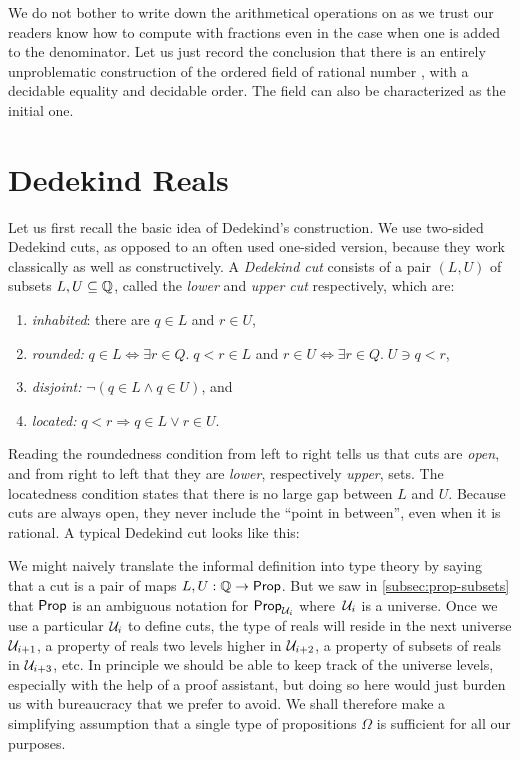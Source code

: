 We do not bother to write down the arithmetical operations on \Q as we trust our readers
know how to compute with fractions even in the case when one is added to the denominator.
Let us just record the conclusion that there is an entirely unproblematic construction of
the ordered field of rational number \Q, with a decidable equality and decidable order.
The field \Q can also be characterized as the initial one.

\section{Dedekind Reals}
\label{sec:dedekind-reals}

Let us first recall the basic idea of Dedekind's construction. We use two-sided Dedekind
cuts, as opposed to an often used one-sided version, because they work classically as well
as constructively. A \emph{Dedekind cut} consists of a pair $(L, U)$ of subsets $L, U
\subseteq \mathbb{Q}$, called the \emph{lower} and \emph{upper cut} respectively, which are:
% 
\begin{enumerate}
\item \emph{inhabited}: there are $q \in L$ and $r \in U$,
\item \emph{rounded:} $q \in L \Leftrightarrow \exists r \in Q .\; q < r \in L$
  and $r \in U \Leftrightarrow \exists r \in Q .\; U \ni q < r$,
\item \emph{disjoint:} $\lnot (q \in L \land q \in U)$, and
\item \emph{located:} $q < r \Rightarrow q \in L \lor r \in U$.
\end{enumerate}
%
Reading the roundedness condition from left to right tells us that cuts are \emph{open},
and from right to left that they are \emph{lower}, respectively \emph{upper}, sets. The
locatedness condition states that there is no large gap between $L$ and $U$. Because cuts
are always open, they never include the ``point in between'', even when it is rational. A
typical Dedekind cut looks like this:
%
\begin{center}
\end{center}
%
We might naively translate the informal definition into type theory by saying that a cut
is a pair of maps $L, U : \mathbb{Q} \to \mathsf{Prop}$. But we saw in \autoref{subsec:prop-subsets} that
$\mathsf{Prop}$ is an ambiguous notation for $\mathsf{Prop}_{\mathcal{U}_i}$ where~$\mathcal{U}_i$ is a universe. Once we
use a particular $\mathcal{U}_i$ to define cuts, the type of reals will reside in the next
universe $\mathcal{U}_{i+1}$, a property of reals two levels higher in $\mathcal{U}_{i+2}$, a property of
subsets of reals in $\mathcal{U}_{i+3}$, etc. In principle we should be able to keep track of the
universe levels, especially with the help of a proof assistant, but doing so here would
just burden us with bureaucracy that we prefer to avoid. We shall therefore make a
simplifying assumption that a single type of propositions $\Omega$ is sufficient for all
our purposes.

